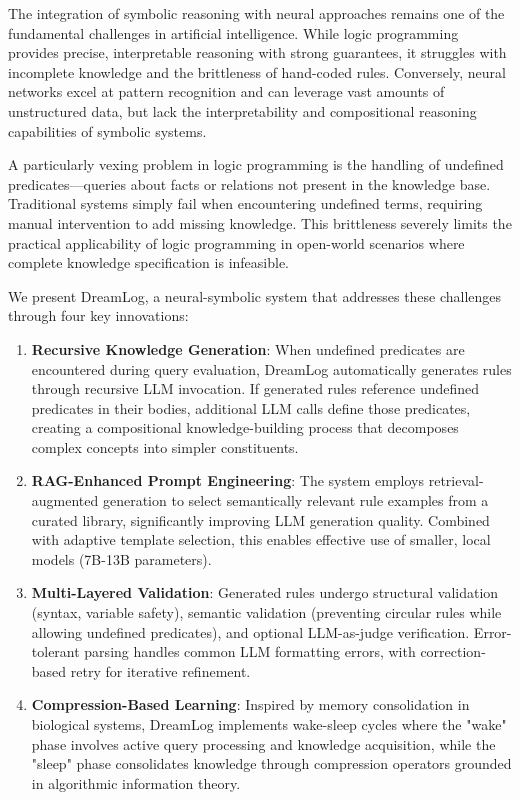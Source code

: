 \documentclass[10pt,conference]{IEEEtran}
\begin{document}
The integration of symbolic reasoning with neural approaches remains one of the fundamental challenges in artificial intelligence. While logic programming provides precise, interpretable reasoning with strong guarantees, it struggles with incomplete knowledge and the brittleness of hand-coded rules. Conversely, neural networks excel at pattern recognition and can leverage vast amounts of unstructured data, but lack the interpretability and compositional reasoning capabilities of symbolic systems.

A particularly vexing problem in logic programming is the handling of undefined predicates—queries about facts or relations not present in the knowledge base. Traditional systems simply fail when encountering undefined terms, requiring manual intervention to add missing knowledge. This brittleness severely limits the practical applicability of logic programming in open-world scenarios where complete knowledge specification is infeasible.

We present DreamLog, a neural-symbolic system that addresses these challenges through four key innovations:

\begin{enumerate}
\item \textbf{Recursive Knowledge Generation}: When undefined predicates are encountered during query evaluation, DreamLog automatically generates rules through recursive LLM invocation. If generated rules reference undefined predicates in their bodies, additional LLM calls define those predicates, creating a compositional knowledge-building process that decomposes complex concepts into simpler constituents.

\item \textbf{RAG-Enhanced Prompt Engineering}: The system employs retrieval-augmented generation to select semantically relevant rule examples from a curated library, significantly improving LLM generation quality. Combined with adaptive template selection, this enables effective use of smaller, local models (7B-13B parameters).

\item \textbf{Multi-Layered Validation}: Generated rules undergo structural validation (syntax, variable safety), semantic validation (preventing circular rules while allowing undefined predicates), and optional LLM-as-judge verification. Error-tolerant parsing handles common LLM formatting errors, with correction-based retry for iterative refinement.

\item \textbf{Compression-Based Learning}: Inspired by memory consolidation in biological systems, DreamLog implements wake-sleep cycles where the "wake" phase involves active query processing and knowledge acquisition, while the "sleep" phase consolidates knowledge through compression operators grounded in algorithmic information theory.
\end{enumerate}
\end{document}
